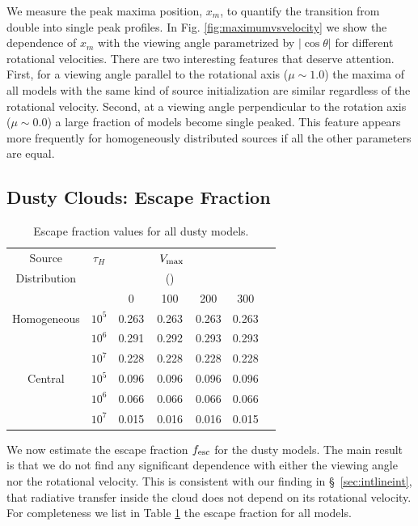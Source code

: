 \documentclass{emulateapj}
\newcommand{\kms}{{\ifmmode{{\mathrm{\,km\ s}^{-1}}}\else{\,km~s$^{-1}$}\fi}}
\begin{document}
We measure the peak maxima position, $x_m$, to quantify the transition from
double into single peak profiles. 
In Fig. \ref{fig:maximumvsvelocity} we show the dependence of $x_m$ with
the viewing angle parametrized by $|\cos\theta|$ for different
rotational velocities.
There are two interesting features that deserve attention. 
First, for a viewing angle parallel to the rotational axis ($\mu\sim
1.0$) the maxima of all models with the same kind of source
initialization are similar regardless of the rotational velocity.  
Second, at a viewing angle perpendicular to the rotation axis ($\mu\sim 0.0$) a
large fraction of models become single peaked. 
This feature appears more frequently for homogeneously distributed
sources if all the other parameters are equal. 

\subsection{Dusty Clouds: Escape Fraction}
\label{sec:escapefraction}

\begin{table}
\begin{center}
\begin{tabular}{c cccccc}
\hline \hline
Source & $\tau_{H}$ & &  $\ V_{\rm max}$& & \\
Distribution& &    & (\kms) & & \\ 
& & 0 & 100 &200 & 300\\ \hline 
Homogeneous & $10^{5}$& 0.263 &  0.263 &  0.263 &  0.263  \\
            & $10^{6}$ & 0.291 &   0.292 &  0.293 &  0.293 \\
            &$10^{7}$ &  0.228 &  0.228 &  0.228 &  0.228 \\
Central & $10^{5}$ &  0.096 & 0.096 &  0.096 & 0.096 \\
  		&$10^{6}$ & 0.066 &  0.066 &  0.066 &  0.066 \\
 		&$10^{7}$ & 0.015 & 0.016 & 0.016 & 0.015 \\
\hline
\end{tabular}
\caption{
 Escape fraction values for all dusty models. } 
\label{table:escape}
\end{center}
\end{table}

We now estimate the escape fraction $f_{\rm esc}$ for the dusty
models. The main result is that we do not find any significant dependence
with either the viewing angle nor the rotational velocity. This is consistent with our finding in \S~\ref{sec:intlineint}, that radiative transfer inside the cloud does not depend on its rotational velocity. For completeness we list in Table \ref{table:escape} the escape
fraction for all models.
\end{document}
